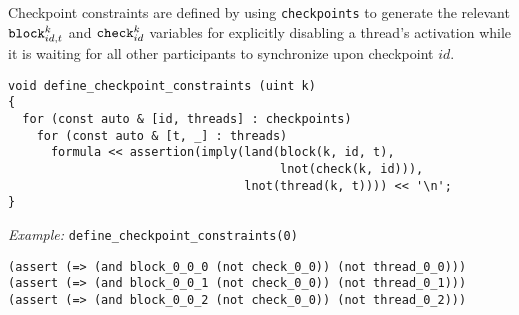 

\noindent
Checkpoint constraints are defined by using \texttt{checkpoints} to generate the relevant $\texttt{block}^k_{id, t}$ and $\texttt{check}^k_{id}$ variables for explicitly disabling a thread's activation while it is waiting for all other participants to synchronize upon checkpoint $id$.

\begin{lstlisting}[style=c++]
void define_checkpoint_constraints (uint k)
{
  for (const auto & [id, threads] : checkpoints)
    for (const auto & [t, _] : threads)
      formula << assertion(imply(land(block(k, id, t),
                                      lnot(check(k, id))),
                                 lnot(thread(k, t)))) << '\n';
}
\end{lstlisting}


\newpage
\noindent
\emph{Example:} \lstinline[style=c++]{define_checkpoint_constraints(0)}

\begin{lstlisting}[language=SMTLib]
(assert (=> (and block_0_0_0 (not check_0_0)) (not thread_0_0)))
(assert (=> (and block_0_0_1 (not check_0_0)) (not thread_0_1)))
(assert (=> (and block_0_0_2 (not check_0_0)) (not thread_0_2)))
\end{lstlisting}

